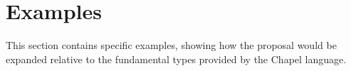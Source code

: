 \section{Examples}
\label{Examples}

This section contains specific examples, showing how the proposal would be expanded
relative to the fundamental types provided by the Chapel language.

